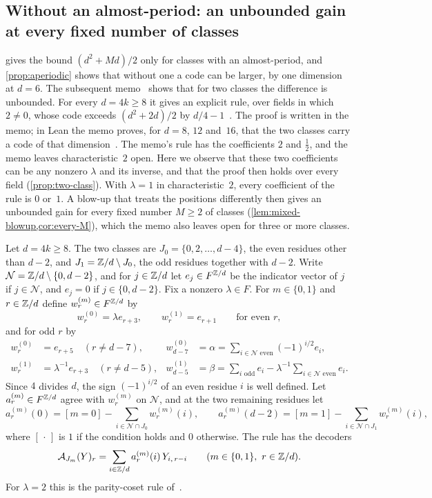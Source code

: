 \subsection{Without an almost-period: an unbounded gain at every fixed number of classes}\label{sec:two-class}

 gives the bound $(d^2+Md)/2$ only for classes with an almost-period, and \cref{prop:aperiodic} shows that
without one a code can be larger, by one dimension at $d=6$. The subsequent memo~\cite{ClassUniformMemo2026} shows that
for two classes the difference is unbounded. For every $d=4k\ge8$ it gives an explicit rule, over fields in which
$2\ne0$, whose code exceeds $(d^2+2d)/2$ by
$d/4-1$~\cite[Definition~4.7 and Theorem~4.8]{ClassUniformMemo2026}. The proof is written in the memo; in Lean the
memo proves, for $d=8$, $12$ and~$16$, that the two classes carry a code of that
dimension~\cite[Theorem~4.9]{ClassUniformMemo2026}. The memo's rule has the coefficients $2$
and $\tfrac12$, and the memo leaves characteristic~$2$ open. Here we observe that these two coefficients can be any
nonzero $\lambda$ and its inverse, and that the proof then holds over every field (\cref{prop:two-class}). With
$\lambda=1$ in characteristic~$2$, every coefficient of the rule is $0$ or~$1$. A blow-up that treats the positions
differently then gives an unbounded gain for every fixed number $M\ge2$ of classes
(\cref{lem:mixed-blowup,cor:every-M}),
which the memo also leaves open for three or more classes.

Let $d=4k\ge8$. The two classes are $J_0=\{0,2,\dots,d-4\}$, the even residues other than $d-2$, and
$J_1=\mathbb{Z}/d\setminus J_0$, the odd residues together with $d-2$. Write $\mathcal N=\mathbb{Z}/d\setminus\{0,d-2\}$, and for
$j\in\mathbb{Z}/d$ let $e_j\in F^{\mathbb{Z}/d}$ be the indicator vector of $j$ if $j\in\mathcal N$, and $e_j=0$ if $j\in\{0,d-2\}$. Fix
a nonzero $\lambda\in F$. For $m\in\{0,1\}$ and $r\in\mathbb{Z}/d$ define $w^{(m)}_r\in F^{\mathbb{Z}/d}$ by
\[
  w^{(0)}_r=\lambda e_{r+3},\qquad w^{(1)}_r=e_{r+1}\qquad\text{for even }r,
\]
and for odd $r$ by
\begin{align*}
  w^{(0)}_r&=e_{r+5}\quad(r\ne d-7), & w^{(0)}_{d-7}&=\alpha=\sum_{i\in\mathcal N\text{ even}}(-1)^{i/2}e_i,\\
  w^{(1)}_r&=\lambda^{-1}e_{r+3}\quad(r\ne d-5), &
  w^{(1)}_{d-5}&=\beta=\sum_{i\text{ odd}}e_i-\lambda^{-1}\sum_{i\in\mathcal N\text{ even}}e_i .
\end{align*}
Since $4$ divides $d$, the sign $(-1)^{i/2}$ of an even residue $i$ is well defined. Let $a^{(m)}_r\in F^{\mathbb{Z}/d}$ agree
with $w^{(m)}_r$ on $\mathcal N$, and at the two remaining residues let
\[
  a^{(m)}_r(0)=[m=0]-\sum_{i\in\mathcal N\cap J_0}w^{(m)}_r(i),\qquad
  a^{(m)}_r(d-2)=[m=1]-\sum_{i\in\mathcal N\cap J_1}w^{(m)}_r(i),
\]
where $[\,\cdot\,]$ is $1$ if the condition holds and $0$ otherwise. The rule has the decoders
\[
  \cA_{J_m}(Y)_r=\sum_{i\in\Z/d}a^{(m)}_r(i)\,Y_{i,\,r-i}\qquad(m\in\{0,1\},\ r\in\Z/d).
\]
For $\lambda=2$ this is the parity-coset rule of~\cite[Definition~4.7]{ClassUniformMemo2026}.

